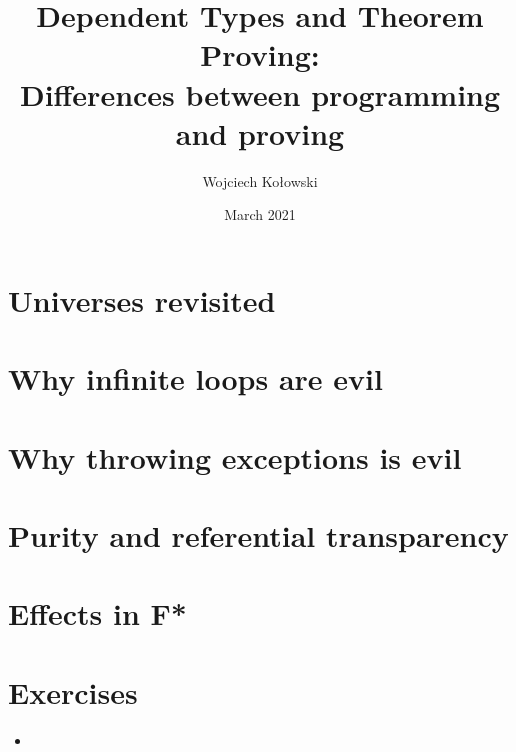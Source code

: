\documentclass{beamer}
\title{Dependent Types and Theorem Proving: \\Differences between programming and proving}
\author{Wojciech Kołowski}
\date{March 2021}
\begin{document}
\frame{\titlepage}
\frame{\tableofcontents}

\section{Universes revisited}

\section{Why infinite loops are evil}

\section{Why throwing exceptions is evil}

\section{Purity and referential transparency}


\section{Effects in F*}

\section{Exercises}
	
\begin{frame}{}
\begin{itemize}
	\item 
\end{itemize}
\end{frame}
\end{document}
